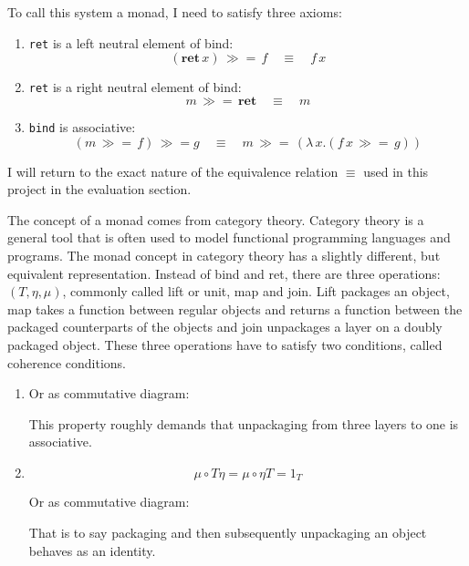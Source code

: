 \documentclass[12pt,twoside,notitlepage]{report}
\theoremstyle{plain}%
\theoremstyle{definition}
\theoremstyle{remark}
\begin{document}
To call this system a monad, I need to satisfy three axioms:

\begin{enumerate}
\item{\lstinline|ret| is a left neutral element of bind:
\[ (\textbf{ret} \, x) \, \gg=\, f \quad \equiv \quad f \, x \]}
\item{\lstinline|ret| is a right neutral element of bind:
\[ m \, \gg=\, \textbf{ret} \quad \equiv \quad m \]}
\item{\lstinline|bind| is associative:
\[ (m \, \gg= \, f) \, \gg= g \quad \equiv \quad m\, \gg= \, (\lambda\, x. (f\, x \, \gg= \, g) ) \]}
\end{enumerate}

I will return to the exact nature of the equivalence relation $ \equiv $ used in this project in the evaluation section. \label{sec:first_mention_of_equiv}


The concept of a monad comes from category theory. Category theory is a general tool that is often used to model functional programming languages and programs. The monad concept in category theory has a slightly different, but equivalent representation. Instead of bind and ret, there are three operations: $ (T, \eta, \mu) $, commonly called lift or unit, map and join. Lift packages an object, map takes a function between regular objects and returns a function between the packaged counterparts of the objects and join unpackages a layer on a doubly packaged object. These three operations have to satisfy two conditions, called coherence conditions.
\begin{enumerate}

\item{
\iftoggle{wordcount}{}{
\[ \mu \circ T \mu = \mu \circ \mu T \]
}
Or as commutative diagram:
\begin{center}
\end{center}
This property roughly demands that unpackaging from three layers to one is associative.



}
\item{
\[ \mu \circ T\eta = \mu \circ \eta T = 1_T \]

Or as commutative diagram:
\begin{center}
\end{center}

That is to say packaging and then subsequently unpackaging an object behaves as an identity.
}
\end{enumerate}
\end{document}
